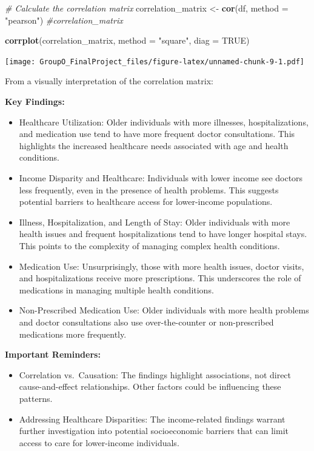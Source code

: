 \documentclass[
]{article}
\newenvironment{Shaded}{\begin{snugshade}}{\end{snugshade}}
\newcommand{\AttributeTok}[1]{\textcolor[rgb]{0.13,0.29,0.53}{#1}}
\newcommand{\CommentTok}[1]{\textcolor[rgb]{0.56,0.35,0.01}{\textit{#1}}}
\newcommand{\ConstantTok}[1]{\textcolor[rgb]{0.56,0.35,0.01}{#1}}
\newcommand{\FunctionTok}[1]{\textcolor[rgb]{0.13,0.29,0.53}{\textbf{#1}}}
\newcommand{\NormalTok}[1]{#1}
\newcommand{\OtherTok}[1]{\textcolor[rgb]{0.56,0.35,0.01}{#1}}
\newcommand{\StringTok}[1]{\textcolor[rgb]{0.31,0.60,0.02}{#1}}
\begin{document}
\begin{Shaded}
\begin{Highlighting}[]
\CommentTok{\# Calculate the correlation matrix}
\NormalTok{correlation\_matrix }\OtherTok{\textless{}{-}} \FunctionTok{cor}\NormalTok{(df, }\AttributeTok{method =} \StringTok{"pearson"}\NormalTok{)}
\CommentTok{\#correlation\_matrix}

\FunctionTok{corrplot}\NormalTok{(correlation\_matrix, }\AttributeTok{method =} \StringTok{"square"}\NormalTok{,}
         \AttributeTok{diag =} \ConstantTok{TRUE}\NormalTok{)}
\end{Highlighting}
\end{Shaded}

\texttt{[image: GroupO\_FinalProject\_files/figure-latex/unnamed-chunk-9-1.pdf]}

From a visually interpretation of the correlation matrix:

\textbf{Key Findings:}

\begin{itemize}
\item
  Healthcare Utilization: Older individuals with more illnesses,
  hospitalizations, and medication use tend to have more frequent doctor
  consultations. This highlights the increased healthcare needs
  associated with age and health conditions.
\item
  Income Disparity and Healthcare: Individuals with lower income see
  doctors less frequently, even in the presence of health problems. This
  suggests potential barriers to healthcare access for lower-income
  populations.
\item
  Illness, Hospitalization, and Length of Stay: Older individuals with
  more health issues and frequent hospitalizations tend to have longer
  hospital stays. This points to the complexity of managing complex
  health conditions.
\item
  Medication Use: Unsurprisingly, those with more health issues, doctor
  visits, and hospitalizations receive more prescriptions. This
  underscores the role of medications in managing multiple health
  conditions.
\item
  Non-Prescribed Medication Use: Older individuals with more health
  problems and doctor consultations also use over-the-counter or
  non-prescribed medications more frequently.
\end{itemize}

\textbf{Important Reminders:}

\begin{itemize}
\item
  Correlation vs.~Causation: The findings highlight associations, not
  direct cause-and-effect relationships. Other factors could be
  influencing these patterns.
\item
  Addressing Healthcare Disparities: The income-related findings warrant
  further investigation into potential socioeconomic barriers that can
  limit access to care for lower-income individuals.
\end{itemize}
\end{document}
